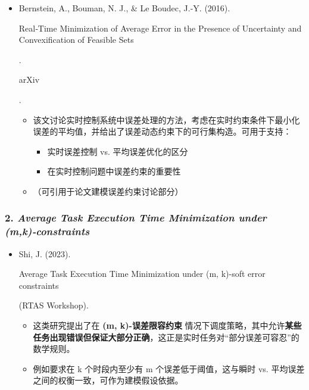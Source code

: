 \documentclass[
]{article}
\begin{document}
\begin{itemize}
\item
  Bernstein, A., Bouman, N. J., \& Le Boudec, J.-Y. (2016).

  Real‑Time Minimization of Average Error in the Presence of Uncertainty
  and Convexification of Feasible Sets

  .

  arXiv

  .

  \begin{itemize}
  \item
    该文讨论实时控制系统中误差处理的方法，考虑在实时约束条件下最小化误差的平均值，并给出了误差动态约束下的可行集构造。可用于支持：

    \begin{itemize}
    \item
      实时误差控制 vs. 平均误差优化的区分
    \item
      在实时控制问题中误差约束的重要性
    \end{itemize}
  \item
    （可引用于论文建模误差约束讨论部分）
  \end{itemize}
\end{itemize}

\subsubsection{\texorpdfstring{2. \emph{Average Task Execution Time
Minimization under
(m,k)‑constraints}}{2. Average Task Execution Time Minimization under (m,k)‑constraints}}\label{2-average-task-execution-time-minimization-under-mkconstraints}

\begin{itemize}
\item
  Shi, J. (2023).

  Average Task Execution Time Minimization under (m, k)-soft error
  constraints

  (RTAS Workshop).

  \begin{itemize}
  \item
    这类研究提出了在 \textbf{(m, k)-误差限容约束}
    情况下调度策略，其中允许\textbf{某些任务出现错误但保证大部分正确}，这正是实时任务对``部分误差可容忍''的数学规则。
  \item
    例如要求在 k 个时段内至少有 m 个误差低于阈值，这与瞬时 vs.
    平均误差之间的权衡一致，可作为建模假设依据。
  \end{itemize}
\end{itemize}
\end{document}
